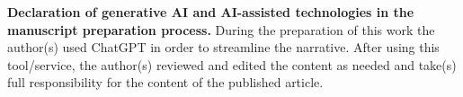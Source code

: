 \documentclass[12pt]{article}
\numberwithin{equation}{section}
\begin{document}
\textbf{Declaration of generative AI and AI-assisted technologies in the manuscript preparation process.}
During the preparation of this work the author(s) used ChatGPT in order to streamline the narrative. After using this tool/service, the author(s) reviewed and edited the content as needed and take(s) full responsibility for the content of the published article.



\clearpage


\end{document}
